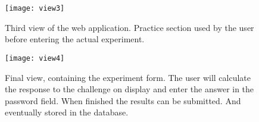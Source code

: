 \begin{figure}
    \texttt{[image: view3]}
    \caption{Third view of the web application. Practice section used by the user before entering the actual experiment.}
    \label{view3}
\end{figure}

\begin{figure}
    \texttt{[image: view4]}
    \caption{Final view, containing the experiment form. The user will calculate the response to the challenge on display and enter the answer in the password field. When finished the results can be submitted. And eventually stored in the database.}
    \label{view4}
\end{figure}
